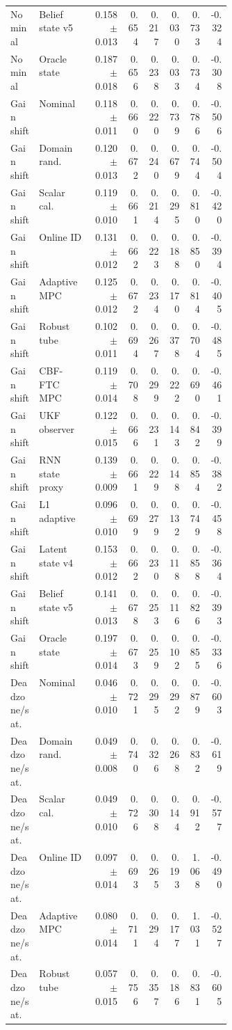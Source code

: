 \documentclass{article}
\begin{document}
\begin{center}
\begin{longtable}{p{0.13\linewidth}p{0.24\linewidth}rrrrrr}
Nominal & Belief state v5 & 0.158 $\pm$ 0.013 & 0.654 & 0.217 & 0.030 & 0.733 & -0.324\\
Nominal & Oracle state & 0.187 $\pm$ 0.018 & 0.656 & 0.238 & 0.033 & 0.734 & -0.308\\
Gain shift & Nominal & 0.118 $\pm$ 0.011 & 0.660 & 0.220 & 0.739 & 0.786 & -0.506\\
Gain shift & Domain rand. & 0.120 $\pm$ 0.013 & 0.672 & 0.240 & 0.679 & 0.744 & -0.504\\
Gain shift & Scalar cal. & 0.119 $\pm$ 0.010 & 0.661 & 0.214 & 0.295 & 0.810 & -0.420\\
Gain shift & Online ID & 0.131 $\pm$ 0.012 & 0.662 & 0.223 & 0.188 & 0.850 & -0.394\\
Gain shift & Adaptive MPC & 0.125 $\pm$ 0.012 & 0.672 & 0.234 & 0.170 & 0.814 & -0.405\\
Gain shift & Robust tube & 0.102 $\pm$ 0.011 & 0.694 & 0.267 & 0.378 & 0.704 & -0.485\\
Gain shift & CBF-FTC MPC & 0.119 $\pm$ 0.014 & 0.708 & 0.299 & 0.222 & 0.690 & -0.461\\
Gain shift & UKF observer & 0.122 $\pm$ 0.015 & 0.666 & 0.231 & 0.143 & 0.842 & -0.399\\
Gain shift & RNN state proxy & 0.139 $\pm$ 0.009 & 0.661 & 0.229 & 0.148 & 0.854 & -0.382\\
Gain shift & L1 adaptive & 0.096 $\pm$ 0.010 & 0.699 & 0.279 & 0.132 & 0.749 & -0.458\\
Gain shift & Latent state v4 & 0.153 $\pm$ 0.012 & 0.662 & 0.230 & 0.118 & 0.858 & -0.364\\
Gain shift & Belief state v5 & 0.141 $\pm$ 0.013 & 0.678 & 0.253 & 0.116 & 0.826 & -0.393\\
Gain shift & Oracle state & 0.197 $\pm$ 0.014 & 0.673 & 0.259 & 0.102 & 0.855 & -0.336\\
Deadzone/sat. & Nominal & 0.046 $\pm$ 0.010 & 0.721 & 0.295 & 0.292 & 0.879 & -0.603\\
Deadzone/sat. & Domain rand. & 0.049 $\pm$ 0.008 & 0.740 & 0.326 & 0.268 & 0.832 & -0.619\\
Deadzone/sat. & Scalar cal. & 0.049 $\pm$ 0.010 & 0.726 & 0.308 & 0.144 & 0.912 & -0.577\\
Deadzone/sat. & Online ID & 0.097 $\pm$ 0.014 & 0.693 & 0.265 & 0.193 & 1.068 & -0.490\\
Deadzone/sat. & Adaptive MPC & 0.080 $\pm$ 0.014 & 0.711 & 0.294 & 0.177 & 1.031 & -0.527\\
Deadzone/sat. & Robust tube & 0.057 $\pm$ 0.015 & 0.756 & 0.357 & 0.186 & 0.831 & -0.605\\

\end{longtable}
\end{center}
\end{document}
